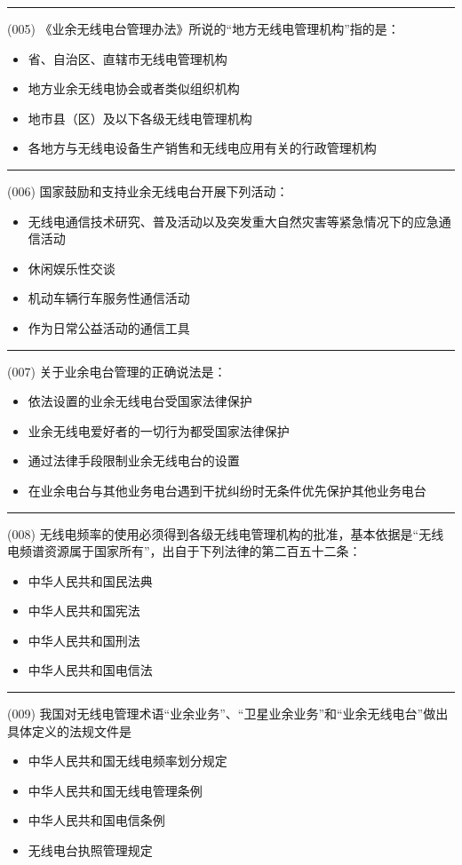 \documentclass[twocolumn]{ctexart}  %
\begin{document}
\noindent\rule{0.5\textwidth}{1pt}
\heiti (005) 《业余无线电台管理办法》所说的“地方无线电管理机构”指的是： \songti {\color{gray} [LK0005] }
\begin{itemize}
	\item  省、自治区、直辖市无线电管理机构
	\item  地方业余无线电协会或者类似组织机构
	\item  地市县（区）及以下各级无线电管理机构
	\item  各地方与无线电设备生产销售和无线电应用有关的行政管理机构
\end{itemize}


\noindent\rule{0.5\textwidth}{1pt}
\heiti (006) 国家鼓励和支持业余无线电台开展下列活动： \songti {\color{gray} [LK0011] }
\begin{itemize}
	\item  无线电通信技术研究、普及活动以及突发重大自然灾害等紧急情况下的应急通信活动
	\item  休闲娱乐性交谈
	\item  机动车辆行车服务性通信活动
	\item  作为日常公益活动的通信工具
\end{itemize}


\noindent\rule{0.5\textwidth}{1pt}
\heiti (007) 关于业余电台管理的正确说法是： \songti {\color{gray} [LK0012] }
\begin{itemize}
	\item  依法设置的业余无线电台受国家法律保护
	\item  业余无线电爱好者的一切行为都受国家法律保护
	\item  通过法律手段限制业余无线电台的设置
	\item  在业余电台与其他业务电台遇到干扰纠纷时无条件优先保护其他业务电台
\end{itemize}


\noindent\rule{0.5\textwidth}{1pt}
\heiti (008) 无线电频率的使用必须得到各级无线电管理机构的批准，基本依据是“无线电频谱资源属于国家所有”，出自于下列法律的第二百五十二条：  \songti {\color{gray} [LK0104] }
\begin{itemize}
	\item  中华人民共和国民法典
	\item  中华人民共和国宪法
	\item  中华人民共和国刑法
	\item  中华人民共和国电信法
\end{itemize}


\noindent\rule{0.5\textwidth}{1pt}
\heiti (009) 我国对无线电管理术语“业余业务”、“卫星业余业务”和“业余无线电台”做出具体定义的法规文件是  \songti {\color{gray} [LK0007] }
\begin{itemize}
	\item  中华人民共和国无线电频率划分规定
	\item  中华人民共和国无线电管理条例
	\item  中华人民共和国电信条例
	\item  无线电台执照管理规定
\end{itemize}
\end{document}
